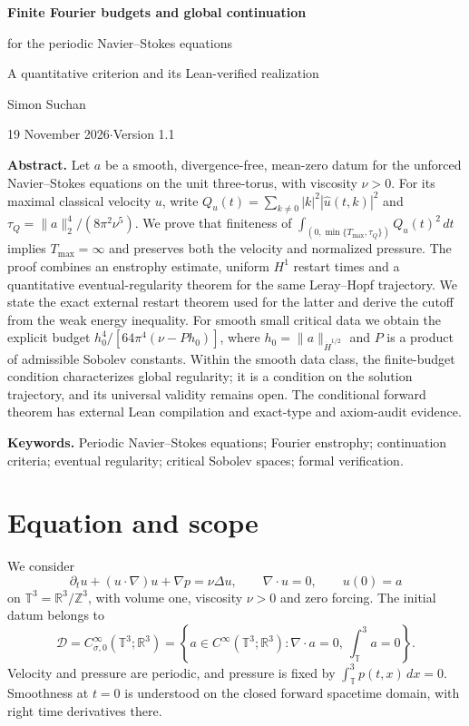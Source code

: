 \documentclass[11pt,a4paper]{article}
\numberwithin{equation}{section}
\theoremstyle{plain}
\theoremstyle{definition}
\theoremstyle{remark}
\newcommand{\T}{\mathbb T^3}
\newcommand{\R}{\mathbb R}
\newcommand{\Z}{\mathbb Z}
\newcommand{\D}{\mathcal D}
\newcommand{\HH}[1]{\dot H^{#1}}
\newcommand{\norm}[2]{\lVert #1\rVert_{#2}}
\newcommand{\Tmax}{T_{\max}}
\newcommand{\tq}{\tau_Q}
\begin{document}
\begin{center}
{\LARGE\bfseries Finite Fourier budgets and global continuation\par
for the periodic Navier--Stokes equations\par}
\vspace{7pt}
{\large\color{paperteal} A quantitative criterion and its Lean-verified realization\par}
\vspace{11pt}
{\large Simon Suchan\par}
\vspace{4pt}
{\small 19 November 2026\enspace$\cdot$\enspace Version 1.1\par}
\end{center}
\vspace{3pt}
\noindent\textbf{Abstract.}
Let $a$ be a smooth, divergence-free, mean-zero datum for the unforced
Navier--Stokes equations on the unit three-torus, with viscosity $\nu>0$.
For its maximal classical velocity $u$, write
$Q_u(t)=\sum_{k\ne0}|k|^2|\widehat u(t,k)|^2$ and
$\tq=\norm{a}{2}^4/(8\pi^2\nu^5)$.
We prove that finiteness of $\int_{(0,\min\{\Tmax,\tq\})}Q_u(t)^2\,dt$
implies $\Tmax=\infty$ and preserves both the velocity and normalized
pressure. The proof combines an enstrophy estimate, uniform $H^1$
restart times and a quantitative eventual-regularity theorem for the same
Leray--Hopf trajectory. We state the exact external restart theorem used
for the latter and derive the cutoff from the weak energy inequality.
For smooth small critical data we obtain the explicit budget
$h_0^4/[64\pi^4(\nu-Ph_0)]$, where
$h_0=\norm{a}{\HH{1/2}}$ and $P$ is a product of admissible Sobolev constants.
Within the smooth data class, the finite-budget condition characterizes
global regularity; it is a condition on the solution trajectory, and its
universal validity remains open. The conditional forward theorem has
external Lean compilation and exact-type and axiom-audit evidence.

\medskip
\noindent\textbf{Keywords.} Periodic Navier--Stokes equations; Fourier enstrophy;
continuation criteria; eventual regularity; critical Sobolev spaces;
formal verification.


\section{Equation and scope}
We consider
\begin{equation}\label{eq:nse}
 \partial_tu+(u\cdot\nabla)u+\nabla p=\nu\Delta u,
 \qquad \nabla\cdot u=0,\qquad u(0)=a
\end{equation}
on $\T=\R^3/\Z^3$, with volume one, viscosity $\nu>0$ and zero forcing.
The initial datum belongs to
\[
 \D=C^\infty_{\sigma,0}(\T;\R^3)
 =\left\{a\in C^\infty(\T;\R^3):\nabla\cdot a=0,\ \int_\T a=0\right\}.
\]
Velocity and pressure are periodic, and pressure is fixed by
$\int_\T p(t,x)\,dx=0$. Smoothness at $t=0$ is understood on the closed
forward spacetime domain, with right time derivatives there.
\end{document}
